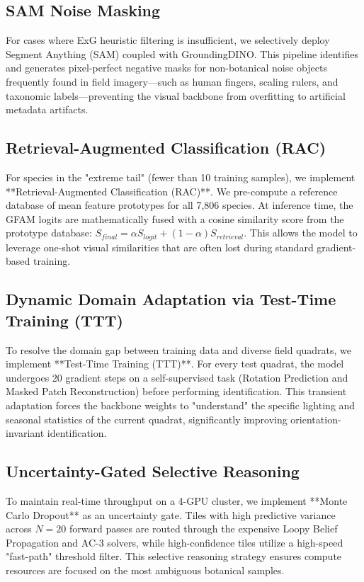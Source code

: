 \documentclass[10pt,twocolumn,letterpaper]{article}
\begin{document}
\subsection{SAM Noise Masking}
For cases where ExG heuristic filtering is insufficient, we selectively deploy Segment Anything (SAM) coupled with GroundingDINO. This pipeline identifies and generates pixel-perfect negative masks for non-botanical noise objects frequently found in field imagery—such as human fingers, scaling rulers, and taxonomic labels—preventing the visual backbone from overfitting to artificial metadata artifacts.

\subsection{Retrieval-Augmented Classification (RAC)}
For species in the "extreme tail" (fewer than 10 training samples), we implement **Retrieval-Augmented Classification (RAC)**. We pre-compute a reference database of mean feature prototypes for all 7,806 species. At inference time, the GFAM logits are mathematically fused with a cosine similarity score from the prototype database: $S_{final} = \alpha S_{logit} + (1-\alpha) S_{retrieval}$. This allows the model to leverage one-shot visual similarities that are often lost during standard gradient-based training.

\subsection{Dynamic Domain Adaptation via Test-Time Training (TTT)}
To resolve the domain gap between training data and diverse field quadrats, we implement **Test-Time Training (TTT)**. For every test quadrat, the model undergoes 20 gradient steps on a self-supervised task (Rotation Prediction and Masked Patch Reconstruction) before performing identification. This transient adaptation forces the backbone weights to "understand" the specific lighting and seasonal statistics of the current quadrat, significantly improving orientation-invariant identification.

\subsection{Uncertainty-Gated Selective Reasoning}
To maintain real-time throughput on a 4-GPU cluster, we implement **Monte Carlo Dropout** as an uncertainty gate. Tiles with high predictive variance across $N=20$ forward passes are routed through the expensive Loopy Belief Propagation and AC-3 solvers, while high-confidence tiles utilize a high-speed "fast-path" threshold filter. This selective reasoning strategy ensures compute resources are focused on the most ambiguous botanical samples.
\end{document}
